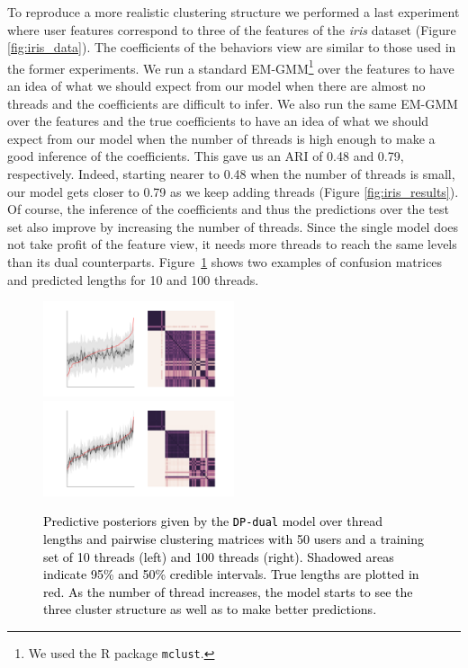 \documentclass[smallextended]{svjour3}          %
\newcommand\alberto[1]{\textcolor{black}{#1}}
\begin{document}
To reproduce a more realistic clustering structure we performed a last experiment where user features correspond to three of the features of the \textit{iris} dataset (Figure \ref{fig:iris_data}). The coefficients of the behaviors view are similar to those used in the former experiments. We run a standard EM-GMM\footnote{We used the R package \texttt{mclust}.} over the features to have an idea of what we should expect from our model when there are almost no threads and the coefficients are difficult to infer. We also run the same EM-GMM over the features and the true coefficients to have an idea of what we should expect from our model when the number of threads is high enough to make a good inference of the coefficients. This gave us an ARI of 0.48 and 0.79, respectively. Indeed, starting nearer to 0.48 when the number of threads is small, our model gets closer to 0.79 as we keep adding threads (Figure \ref{fig:iris_results}). Of course, the inference of the coefficients and thus the predictions over the test set also improve by increasing the number of threads. Since the single model does not take profit of the feature view, it needs more threads to reach the same levels than its dual counterparts. Figure~\ref{fig:iris_posteriors} shows two examples of confusion matrices and predicted lengths for 10 and 100 threads.
\begin{figure}
	\centering
	\includegraphics[width=0.5\textwidth]{Fig9_iris_posterior_10}%
	\includegraphics[width=0.5\textwidth]{Fig9_iris_posterior_100}
	\caption{\alberto{Predictive posteriors given by the \texttt{DP-dual} model over thread lengths and pairwise clustering matrices with 50 users and a training set of 10 threads (left) and 100 threads (right). Shadowed areas indicate 95\% and 50\% credible intervals. True lengths are plotted in red. As the number of thread increases, the model starts to see the three cluster structure as well as to make better predictions.}}
	\label{fig:iris_posteriors}
\end{figure}
\end{document}

